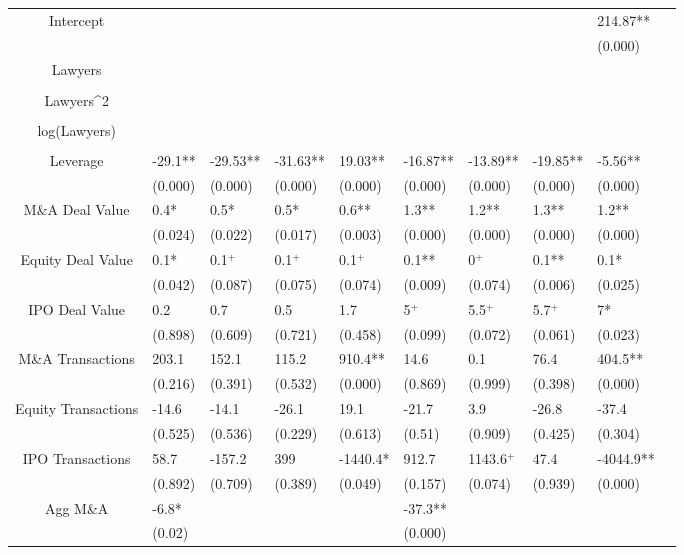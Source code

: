 \documentclass{article}
\begin{document}
\begin{table}[H]
\begin{tabular}{|clllllllll|}
Intercept &  &  &  &  &  &  &  & 214.87** & \\ 
   &  &  &  &  &  &  &  & (0.000) & \\ 
  Lawyers &  &  &  &  &  &  &  &  & \\ 
   &  &  &  &  &  &  &  &  & \\ 
  Lawyers^2 &  &  &  &  &  &  &  &  & \\ 
   &  &  &  &  &  &  &  &  & \\ 
  log(Lawyers) &  &  &  &  &  &  &  &  & \\ 
   &  &  &  &  &  &  &  &  & \\ 
  Leverage & -29.1** & -29.53** & -31.63** & 19.03** & -16.87** & -13.89** & -19.85** & -5.56** & \\ 
   & (0.000) & (0.000) & (0.000) & (0.000) & (0.000) & (0.000) & (0.000) & (0.000) & \\ 
  M\&A Deal Value & 0.4* & 0.5* & 0.5* & 0.6** & 1.3** & 1.2** & 1.3** & 1.2** & \\ 
   & (0.024) & (0.022) & (0.017) & (0.003) & (0.000) & (0.000) & (0.000) & (0.000) & \\ 
  Equity Deal Value & 0.1* & 0.1$^{+}$ & 0.1$^{+}$ & 0.1$^{+}$ & 0.1** & 0$^{+}$ & 0.1** & 0.1* & \\ 
   & (0.042) & (0.087) & (0.075) & (0.074) & (0.009) & (0.074) & (0.006) & (0.025) & \\ 
  IPO Deal Value & 0.2 & 0.7 & 0.5 & 1.7 & 5$^{+}$ & 5.5$^{+}$ & 5.7$^{+}$ & 7* & \\ 
   & (0.898) & (0.609) & (0.721) & (0.458) & (0.099) & (0.072) & (0.061) & (0.023) & \\ 
  M\&A Transactions & 203.1 & 152.1 & 115.2 & 910.4** & 14.6 & 0.1 & 76.4 & 404.5** & \\ 
   & (0.216) & (0.391) & (0.532) & (0.000) & (0.869) & (0.999) & (0.398) & (0.000) & \\ 
  Equity Transactions & -14.6 & -14.1 & -26.1 & 19.1 & -21.7 & 3.9 & -26.8 & -37.4 & \\ 
   & (0.525) & (0.536) & (0.229) & (0.613) & (0.51) & (0.909) & (0.425) & (0.304) & \\ 
  IPO Transactions & 58.7 & -157.2 & 399 & -1440.4* & 912.7 & 1143.6$^{+}$ & 47.4 & -4044.9** & \\ 
   & (0.892) & (0.709) & (0.389) & (0.049) & (0.157) & (0.074) & (0.939) & (0.000) & \\ 
  Agg M\&A & -6.8* &  &  &  & -37.3** &  &  &  & \\ 
   & (0.02) &  &  &  & (0.000) &  &  &  & \\ 

\end{tabular}
\end{table}
\end{document}

